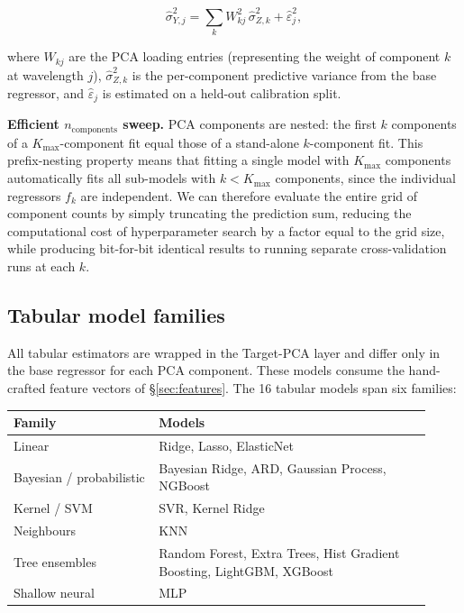 \documentclass[12pt]{article}
\begin{document}
\[
\hat{\sigma}^2_{Y,j} = \sum_k W_{kj}^2\,\hat{\sigma}^2_{Z,k} + \hat{\varepsilon}^2_j,
\]

where $W_{kj}$ are the PCA loading entries (representing the weight of component $k$ at wavelength $j$), $\hat{\sigma}^2_{Z,k}$ is the per-component predictive variance from the base regressor, and $\hat{\varepsilon}_j$ is estimated on a held-out calibration split.

\textbf{Efficient $n_{\text{components}}$ sweep.} PCA components are nested: the first $k$ components of a $K_{\max}$-component fit equal those of a stand-alone $k$-component fit. This prefix-nesting property means that fitting a single model with $K_{\max}$ components automatically fits all sub-models with $k < K_{\max}$ components, since the individual regressors $f_k$ are independent. We can therefore evaluate the entire grid of component counts by simply truncating the prediction sum, reducing the computational cost of hyperparameter search by a factor equal to the grid size, while producing bit-for-bit identical results to running separate cross-validation runs at each $k$.

\subsection{Tabular model families}

All tabular estimators are wrapped in the Target-PCA layer and differ only in the base regressor for each PCA component. These models consume the hand-crafted feature vectors of \S\ref{sec:features}. The 16 tabular models span six families:

\begin{center}\small
\begin{tabular}{@{}p{0.32\linewidth} p{0.60\linewidth}@{}}
\toprule
\textbf{Family} & \textbf{Models} \\
\midrule
Linear & Ridge, Lasso, ElasticNet \\
Bayesian / probabilistic & Bayesian Ridge, ARD, Gaussian Process, NGBoost \\
Kernel / SVM & SVR, Kernel Ridge \\
Neighbours & KNN \\
Tree ensembles & Random Forest, Extra Trees, Hist Gradient Boosting, LightGBM, XGBoost \\
Shallow neural & MLP \\
\bottomrule
\end{tabular}
\end{center}
\end{document}
